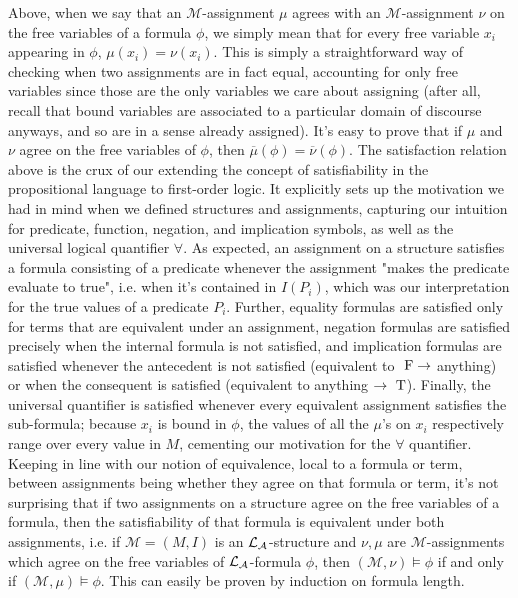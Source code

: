 \documentclass{article}
\begin{document}
Above, when we say that an $ \mathcal{M} $-assignment $ \mu $ agrees with an $ \mathcal{M} $-assignment $ \nu $ on the free variables of a formula $ \phi $, we simply mean that for every free variable $ x_i $ appearing in $ \phi $, $ \mu(x_i) = \nu(x_i) $. This is simply a straightforward way of checking when two assignments are in fact equal, accounting for only free variables since those are the only variables we care about assigning (after all, recall that bound variables are associated to a particular domain of discourse anyways, and so are in a sense already assigned). It's easy to prove that if $ \mu $ and $ \nu $ agree on the free variables of $ \phi $, then $ \overline{\mu}(\phi) = \overline{\nu}(\phi) $.
\nn
The satisfaction relation above is the crux of our extending the concept of satisfiability in the propositional language to first-order logic. It explicitly sets up the motivation we had in mind when we defined structures and assignments, capturing our intuition for predicate, function, negation, and implication symbols, as well as the universal logical quantifier $ \forall $. As expected, an assignment on a structure satisfies a formula consisting of a predicate whenever the assignment "makes the predicate evaluate to true", i.e. when it's contained in $ I(P_i) $, which was our interpretation for the true values of a predicate $ P_i $. Further, equality formulas are satisfied only for terms that are equivalent under an assignment, negation formulas are satisfied precisely when the internal formula is not satisfied, and implication formulas are satisfied whenever the antecedent is not satisfied (equivalent to $ \text{\normalfont\ F} \rightarrow $ anything) or when the consequent is satisfied (equivalent to anything $ \rightarrow \text{\normalfont\ T} $). Finally, the universal quantifier is satisfied whenever every equivalent assignment satisfies the sub-formula; because $ x_i $ is bound in $ \phi $, the values of all the $ \mu $'s on $ x_i $ respectively range over every value in $ M $, cementing our motivation for the $ \forall $ quantifier.
\nn
Keeping in line with our notion of equivalence, local to a formula or term, between assignments being whether they agree on that formula or term, it's not surprising that if two assignments on a structure agree on the free variables of a formula, then the satisfiability of that formula is equivalent under both assignments, i.e. if $ \mathcal{M} = (M, I) $ is an $ \mathcal{L}_{\mathcal{A}} $-structure and $ \nu, \mu $ are $ \mathcal{M} $-assignments which agree on the free variables of $ \mathcal{L}_{\mathcal{A}} $-formula $ \phi $, then $ (\mathcal{M}, \nu) \vDash \phi $ if and only if $ (\mathcal{M}, \mu) \vDash \phi $. This can easily be proven by induction on formula length.
\end{document}
